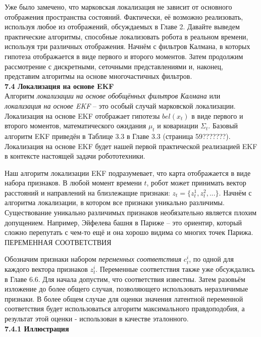 \documentclass[10pt,a4paper]{article}
\begin{document}
Уже было замечено, что марковская локализация не зависит от основного отображения пространства состояний. Фактически, её возможно реализовать, используя любое из отображений, обсуждаемых в Главе 2. Давайте выведем практические алгоритмы, способные локализовать робота в реальном времени, используя три различных отображения. Начнём с фильтров Калмана, в которых  гипотеза отображается в виде первого и второго моментов. Затем продолжим рассмотрение с дискретными, сеточными представлениями и, наконец, представим алгоритмы на основе многочастичных фильтров.\\

\textbf{7.4 Локализация на основе EKF}\\

Алгоритм  \textit{локализации на основе обобщённых фильтров Калмана} или \textit{локализация на основе EKF} – это особый случай марковской локализации. Локализация на основе EKF отображает гипотезы $bel(x_t)$ в виде первого и второго моментов, математического ожидания $\mu_t$ и ковариации $\varSigma_t$. Базовый алгоритм EKF приведён в Таблице 3.3 в Главе 3.3 (страница 59???????). Локализация на основе EKF будет нашей первой практической реализацией EKF в контексте настоящей задачи робототехники. 

Наш алгоритм локализации EKF подразумевает, что карта отображается в виде набора признаков. В любой момент времени $t$, робот может принимать вектор расстояний и направлений на близлежащие признаки: $z_t = \{z_t^1, z_t^2, . . .\}$. Начнём с алгоритма локализации, в котором все признаки уникально различимы.
Существование уникально различимых признаков необязательно является плохим допущением. Например, Эйфелева башня в Париже – это ориентир, который сложно перепутать с чем-то ещё и она хорошо видима со многих точек Парижа.\\
ПЕРЕМЕННАЯ СООТВЕТСТВИЯ

Обозначим признаки набором \textit{переменных соответствия} $c^i_t$, по одной для каждого вектора признаков $z^i_t$. Переменные соответствия также уже обсуждались в Главе 6.6. Для начала допустим, что соответствия известны. Затем разовьём изложение до более общего случая, позволяющего использовать неразличимые признаки. В более общем случае для оценки значения латентной переменной соответствия будет использоваться алгоритм максимального правдоподобия, а результат этой оценки - использован в качестве эталонного.\\

\textbf{7.4.1 Иллюстрация} \\
\end{document}
